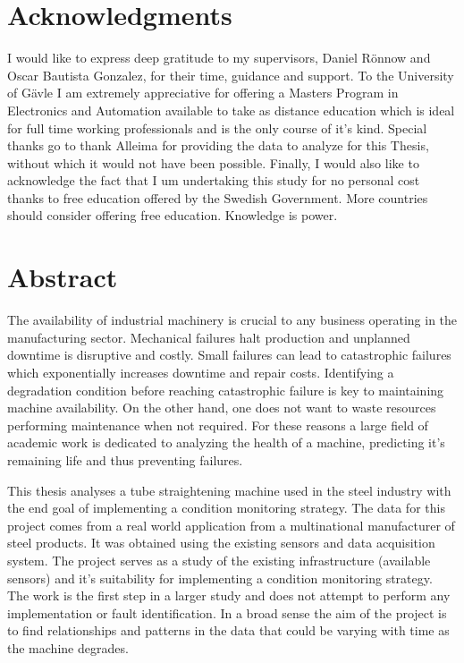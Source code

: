 \documentclass[]{article}
\begin{document}
\setmainfont{Perpetua}

\newpage
\thispagestyle{empty}
\mbox{}
\newpage
{}

\section*{Acknowledgments}
I would like to express deep gratitude to my supervisors, Daniel Rönnow and Oscar Bautista Gonzalez, for their time, guidance and support. To the University of Gävle I am extremely appreciative for offering a Masters Program in Electronics and Automation available to take as distance education which is ideal for full time working professionals and is the only course of it's kind. Special thanks go to thank Alleima for providing the data to analyze for this Thesis, without which it would not have been possible. Finally, I would also like to acknowledge the fact that I um undertaking this study for no personal cost thanks to free education offered by the Swedish Government. More countries should consider offering free education. Knowledge is power.
\newpage

\section*{Abstract}
The availability of industrial machinery is crucial to any business operating in the manufacturing sector. Mechanical failures halt production and unplanned downtime is disruptive and costly. Small failures can lead to catastrophic failures which exponentially increases downtime and repair costs. Identifying a degradation condition before reaching catastrophic failure is key to maintaining machine availability. On the other hand, one does not want to waste resources performing maintenance when not required. For these reasons a large field of academic work is dedicated to analyzing the health of a machine, predicting it's remaining life and thus preventing failures.

This thesis analyses a tube straightening machine used in the steel industry with the end goal of implementing a condition monitoring strategy. The data for this project comes from a real world application from a multinational manufacturer of steel products. It was obtained using the existing sensors and data acquisition system. The project serves as a study of the existing infrastructure (available sensors) and it's suitability for implementing a condition monitoring strategy. The work is the first step in a larger study and does not attempt to perform any implementation or fault identification. In a broad sense the aim of the project is to find relationships and patterns in the data that could be varying with time as the machine degrades.
\end{document}
